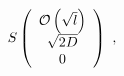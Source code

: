 \documentclass[12pt]{article}
\begin{document}
\begin{displaymath}
S \left( \begin{array} { c } { { \cal { O } } \left( \sqrt { l } \right) } \\ { \sqrt { 2 D } } \\ { 0 } \\ \end{array} \right) ~ ,
\end{displaymath}
\end{document}
